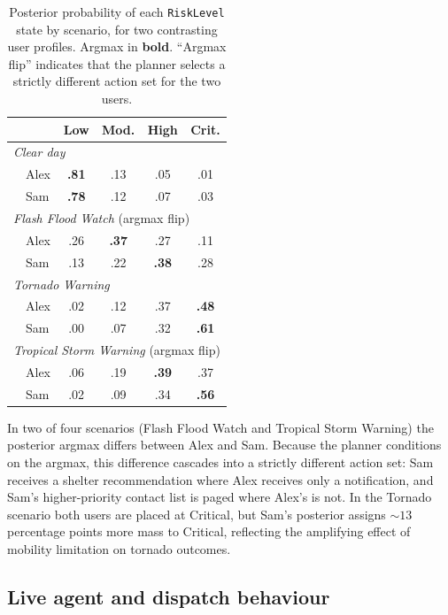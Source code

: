 \documentclass{article}
\theoremstyle{plain}
\theoremstyle{definition}
\theoremstyle{remark}
\begin{document}
\begin{table}[h]
\caption{Posterior probability of each \texttt{RiskLevel} state by
scenario, for two contrasting user profiles. Argmax in \textbf{bold}.
``Argmax flip'' indicates that the planner selects a strictly different
action set for the two users.}
\label{tab:scenarios}
\centering\footnotesize
\begin{tabular}{lcccc}
\toprule
& Low & Mod. & High & Crit. \\
\midrule
\multicolumn{5}{l}{\textit{Clear day}} \\
~~Alex                & \textbf{.81} & .13 & .05 & .01 \\
~~Sam                 & \textbf{.78} & .12 & .07 & .03 \\
\midrule
\multicolumn{5}{l}{\textit{Flash Flood Watch} \quad (argmax flip)} \\
~~Alex                & .26 & \textbf{.37} & .27 & .11 \\
~~Sam                 & .13 & .22 & \textbf{.38} & .28 \\
\midrule
\multicolumn{5}{l}{\textit{Tornado Warning}} \\
~~Alex                & .02 & .12 & .37 & \textbf{.48} \\
~~Sam                 & .00 & .07 & .32 & \textbf{.61} \\
\midrule
\multicolumn{5}{l}{\textit{Tropical Storm Warning} \quad (argmax flip)} \\
~~Alex                & .06 & .19 & \textbf{.39} & .37 \\
~~Sam                 & .02 & .09 & .34 & \textbf{.56} \\
\bottomrule
\end{tabular}
\end{table}

In two of four scenarios (Flash Flood Watch and Tropical Storm
Warning) the posterior argmax differs between Alex and Sam. Because
the planner conditions on the argmax, this difference cascades into a
strictly different action set: Sam receives a shelter recommendation
where Alex receives only a notification, and Sam's higher-priority
contact list is paged where Alex's is not. In the Tornado scenario
both users are placed at Critical, but Sam's posterior assigns
$\sim 13$ percentage points more mass to Critical, reflecting the
amplifying effect of mobility limitation on tornado outcomes.

\subsection{Live agent and dispatch behaviour}
\end{document}
